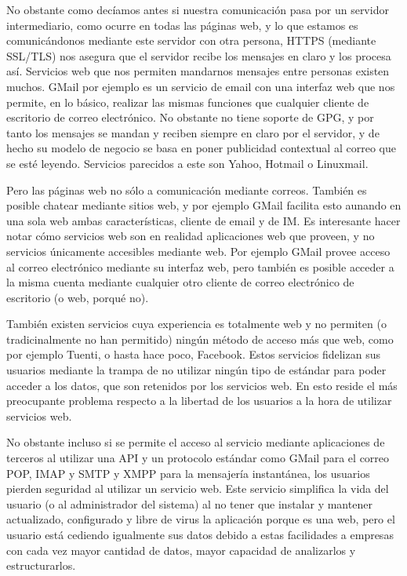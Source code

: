 No obstante como decíamos antes si nuestra comunicación pasa por un servidor intermediario, como ocurre en todas las páginas web, y lo que estamos es comunicándonos mediante este servidor con otra persona, HTTPS (mediante SSL/TLS) nos asegura que el servidor recibe los mensajes en claro y los procesa así. Servicios web que nos permiten mandarnos mensajes entre personas existen muchos. GMail por ejemplo es un servicio de email con una interfaz web que nos permite, en lo básico, realizar las mismas funciones que cualquier cliente de escritorio de correo electrónico. No obstante no tiene soporte de GPG, y por tanto los mensajes se mandan y reciben siempre en claro por el servidor, y de hecho su modelo de negocio se basa en poner publicidad contextual al correo que se esté leyendo. Servicios parecidos a este son Yahoo, Hotmail o Linuxmail.

Pero las páginas web no sólo a comunicación mediante correos. También es posible chatear mediante sitios web, y por ejemplo GMail facilita esto aunando en una sola web ambas características, cliente de email y de IM. Es interesante hacer notar cómo servicios web son en realidad aplicaciones web que proveen, y no servicios únicamente accesibles mediante web. Por ejemplo GMail provee acceso al correo electrónico mediante su interfaz web, pero también es posible acceder a la misma cuenta mediante cualquier otro cliente de correo electrónico de escritorio (o web, porqué no).


También existen servicios cuya experiencia es totalmente web y no permiten (o tradicinalmente no han permitido) ningún método de acceso más que web, como por ejemplo Tuenti, o hasta hace poco, Facebook. Estos servicios fidelizan sus usuarios mediante la trampa de no utilizar ningún tipo de estándar para poder acceder a los datos, que son retenidos por los servicios web. En esto reside el más preocupante problema respecto a la libertad de los usuarios a la hora de utilizar servicios web.

No obstante incluso si se permite el acceso al servicio mediante aplicaciones de terceros al utilizar una API y un protocolo estándar como GMail para el correo POP, IMAP y SMTP y XMPP para la mensajería instantánea, los usuarios pierden seguridad al utilizar un servicio web. Este servicio simplifica la vida del usuario (o al administrador del sistema) al no tener que instalar y mantener actualizado, configurado y libre de virus la aplicación porque es una web, pero el usuario está cediendo igualmente sus datos debido a estas facilidades a empresas con cada vez mayor cantidad de datos, mayor capacidad de analizarlos y estructurarlos.

